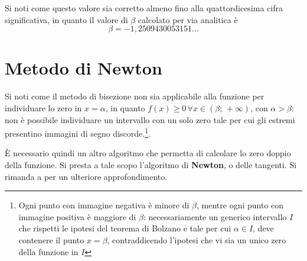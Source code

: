 Si noti come questo valore sia corretto almeno fino alla quattordicesima cifra significativa, in quanto il valore di $\beta$ calcolato per via analitica è
\[
\beta=-1,2509430053151\dots
\]

\begin{table}
\end{table}

\section{Metodo di Newton}

Si noti come il metodo di bisezione non sia applicabile alla funzione per individuare lo zero in $x=\alpha$, in quanto $f(x)\ge 0\,\forall x\in (\beta;\,+\infty)$, con $\alpha>\beta$: non è possibile individuare un intervallo con un solo zero tale per cui gli estremi presentino immagini di segno discorde.\footnote{Ogni punto con immagine negativa è minore di $\beta$, mentre ogni punto con immagine positiva è maggiore di $\beta$: necessariamente un generico intervallo $I$ che rispetti le ipotesi del teorema di Bolzano e tale per cui $\alpha\in I$, deve contenere il punto $x=\beta$, contraddicendo l'ipotesi che vi sia un unico zero della funzione in $I$}.

È necessario quindi un altro algoritmo che permetta di calcolare lo zero doppio della funzione. Si presta a tale scopo l'algoritmo di \textbf{Newton}, o delle tangenti. Si rimanda a \parencite[67-71]{num:an} per un ulteriore approfondimento.

